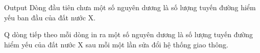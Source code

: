 Output  
Dòng đầu tiên chưa một số nguyên dương là số lượng tuyến đường hiểm yếu ban đầu của đất nước X.  

   Q dòng tiếp theo mỗi dòng in ra một số nguyên dương là số lượng tuyến đường hiểm yếu của đất nước X sau mỗi một lần sửa đổi hệ thống giao thông.